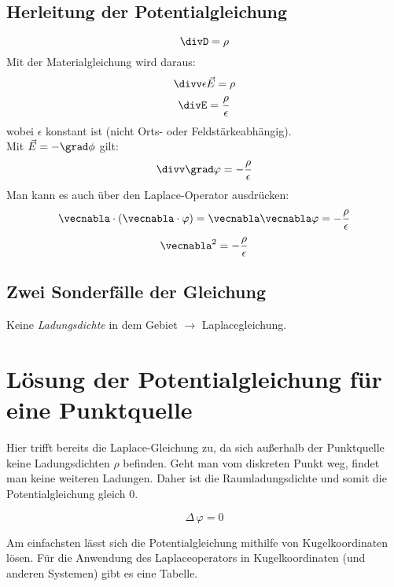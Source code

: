 \documentclass[11pt, a4paper]{article}
\begin{document}
\subsection{Herleitung der Potentialgleichung}
\[\divD = \rho\]
Mit der Materialgleichung wird daraus:
\[\divv \epsilon \vec{E} = \rho\]
\[\divE = \frac{\rho}{\epsilon}\]
wobei $\epsilon$ konstant ist (nicht Orts- oder Feldstärkeabhängig).\\
Mit $\vec{E} = -\grad \phi$ gilt:
\[\divv \grad \varphi = -\frac{\rho}{\epsilon}\]
Man kann es auch über den Laplace-Operator ausdrücken:
\[\vecnabla \cdot (\vecnabla \cdot \varphi) = \vecnabla \vecnabla \varphi = -\frac{\rho}{\epsilon}\]
\[\vecnabla^{2}=-\frac{\rho}{\epsilon}\]


\subsection{Zwei Sonderfälle der Gleichung}
Keine \emph{Ladungsdichte} in dem Gebiet $\rightarrow$ Laplacegleichung.


\section{Lösung der Potentialgleichung für eine Punktquelle}

\begin{figure}[H]
\centering
{}
\end{figure}

Hier trifft bereits die Laplace-Gleichung zu, da sich außerhalb der Punktquelle keine Ladungsdichten $\rho$ befinden. Geht man vom diskreten Punkt weg, findet man keine weiteren Ladungen. Daher ist die Raumladungsdichte und somit die Potentialgleichung gleich 0.

\[\Delta \, \varphi = 0\]

Am einfachsten lässt sich die Potentialgleichung mithilfe von Kugelkoordinaten lösen. Für die Anwendung des Laplaceoperators in Kugelkoordinaten (und anderen Systemen) gibt es eine Tabelle.

\begin{figure}[H]
\centering
{}
\end{figure}
\end{document}
